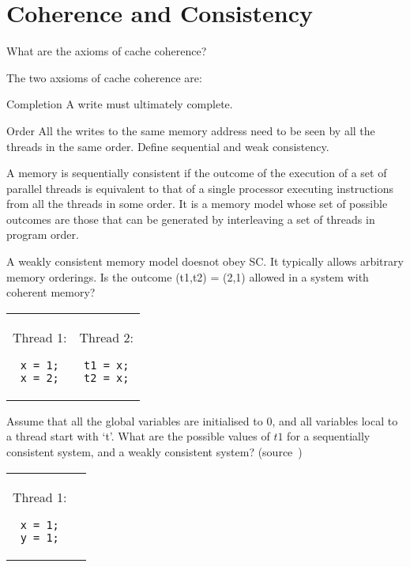 \section*{Coherence and Consistency}
\begin{ExerciseList}
\Exercise
What are the axioms of cache coherence?
\Answer

The two axsioms of cache coherence are:
\item Completion A write must ultimately complete.
\item Order All the writes to the same memory address need to be seen by all the threads in the same order.
\Exercise
Define sequential and weak consistency.
\Answer
\item A memory is sequentially consistent if the outcome of the execution of a set of parallel threads is equivalent to that of a single processor executing instructions from all the threads in some order. It is a memory model whose set of possible outcomes are those that can be generated by interleaving a set of threads in program order.
\item A weakly consistent memory model doesnot obey SC. It typically allows arbitrary memory orderings.
\Exercise
Is the outcome (t1,t2) = (2,1) allowed in a system with coherent memory? \\

\begin{tabular}{cc}
\begin{minipage}{0.5\textwidth}
Thread 1:
\begin{Verbatim}
x = 1;
x = 2;
\end{Verbatim}
\end{minipage}

& 
\begin{minipage}{0.5\textwidth}
Thread 2:
\begin{Verbatim}
t1 = x;
t2 = x;
\end{Verbatim}
\end{minipage}
\end{tabular}

\Exercise
Assume that all the global variables are initialised to 0, and all variables local to a thread start with `t'.
What are the possible values of $t1$ for a sequentially consistent system, and a weakly consistent system?
 (source~\cite{shared-mem-tut})\\

\begin{tabular}{cc}
\begin{minipage}{0.5\textwidth}
Thread 1:
\begin{Verbatim}
x = 1;
y = 1;
\end{Verbatim}
\end{minipage} 


\end{tabular}
\end{ExerciseList}
